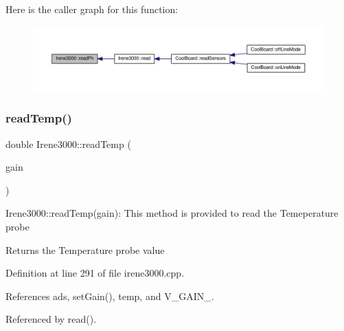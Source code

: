 Here is the caller graph for this function\+:
\nopagebreak
\begin{figure}[H]
\begin{center}
\leavevmode
\includegraphics[width=350pt]{classIrene3000_abf3db725fabb0634ec889b32068a5eec_icgraph}
\end{center}
\end{figure}
\mbox{\label{classIrene3000_a94ad40f281d83ad1be20bf1edd6fe802}} 
\subsubsection{\texorpdfstring{read\+Temp()}{readTemp()}}
{\footnotesize\ttfamily double Irene3000\+::read\+Temp (\begin{DoxyParamCaption}\item[{ads\+Gain\+\_\+t}]{gain }\end{DoxyParamCaption})}

Irene3000\+::read\+Temp(gain)\+: This method is provided to read the Temeperature probe

\begin{DoxyReturn}{Returns}
the Temperature probe value 
\end{DoxyReturn}


Definition at line 291 of file irene3000.\+cpp.



References ads, set\+Gain(), temp, and V\+\_\+\+G\+A\+I\+N\+\_.



Referenced by read().


